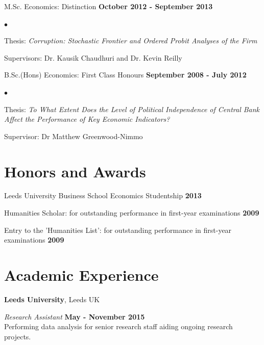 \documentclass[margin,line,9pt]{res}
\newenvironment{list1}{
  \begin{list}{\ding{113}}{%
      \setlength{\itemsep}{0in}
      \setlength{\parsep}{0in} \setlength{\parskip}{0in}
      \setlength{\topsep}{0in} \setlength{\partopsep}{0in} 
      \setlength{\leftmargin}{0.17in}}}{\end{list}}
\newenvironment{list2}{
  \begin{list}{$\bullet$}{%
      \setlength{\itemsep}{0in}
      \setlength{\parsep}{0in} \setlength{\parskip}{0in}
      \setlength{\topsep}{0in} \setlength{\partopsep}{0in} 
      \setlength{\leftmargin}{0.2in}}}{\end{list}}
\begin{document}
\begin{resume}
\vspace*{.1in}
\begin{list1}
\item[] M.Sc. Economics: Distinction \hfill {\bf October 2012 - September 2013}
\vspace*{.05in}
\begin{list2}
\item Thesis: \textit{Corruption: Stochastic Frontier and Ordered Probit Analyses of the Firm}
\item Supervisors:  Dr. Kausik Chaudhuri and Dr. Kevin Reilly
\end{list2}
\end{list1}

\vspace*{.1in}
\begin{list1}
\item[] B.Sc.(Hons) Economics: First Class Honours \hfill {\bf September 2008 - July 2012}
\vspace*{.05in}
\begin{list2}
\item Thesis: \textit{To What Extent Does the Level of Political Independence of Central Bank Affect the Performance of Key Economic Indicators?}
\item Supervisor: Dr Matthew Greenwood-Nimmo
\end{list2}
\end{list1}


\section{\sc Honors and Awards} 
Leeds University Business School Economics Studentship \hfill {\bf 2013}

\vspace*{-2.5mm}
Humanities Scholar: for outstanding performance in first-year examinations \hfill {\bf 2009}

\vspace*{-2.5mm}
Entry to the 'Humanities List': for outstanding performance in first-year examinations \hfill {\bf 2009}

\section{\sc Academic Experience}
{\bf Leeds University}, Leeds UK

\vspace{-.3cm}
{\em Research Assistant} \hfill {\bf May - November 2015}\\
Performing data analysis for senior research staff aiding ongoing research projects.


\end{resume}
\end{document}
